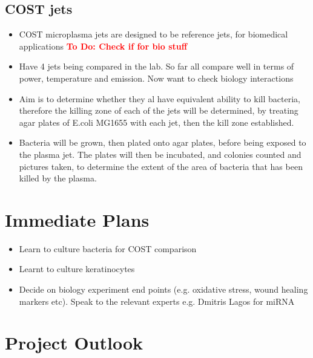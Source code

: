 \documentclass[11pt, oneside]{article}   	%
\newcommand{\todo}[1]{ \textcolor{red}{\bf{To Do:} #1}}
\begin{document}
\subsection{COST jets}
\begin{itemize}
\item COST microplasma jets are designed to be reference jets, for biomedical applications \todo{Check if for bio stuff}
\item Have 4 jets being compared in the lab. So far all compare well in terms of power, temperature and emission. Now want to check biology interactions
\item Aim is to determine whether they al have equivalent ability to kill bacteria, therefore the killing zone of each of the jets will be determined, by treating agar plates of E.coli MG1655 with each jet, then the kill zone established.
\item Bacteria will be grown, then plated onto agar plates, before being exposed to the plasma jet. 
The plates will then be incubated, and colonies counted and pictures taken, to determine the extent of the area of bacteria that has been killed by the plasma.
\end{itemize}
 

\section{Immediate Plans}

\begin{itemize}
\item Learn to culture bacteria for COST comparison
\item Learnt to culture keratinocytes
\item Decide on biology experiment end points (e.g. oxidative stress, wound healing markers etc). Speak to the relevant experts e.g. Dmitris Lagos for miRNA
\end{itemize}

\section{Project Outlook}
\end{document}
